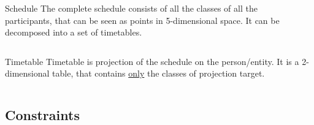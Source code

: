 \documentclass{beamer}
\providecommand{\rootdir}{../doc}
\newcommand{\resizeinput}[2][1]{%
  \resizebox{#1\textwidth}{!}{}%
}
\begin{document}
\begin{frame}
  \begin{columns}
    \begin{column}{4cm}
      \begin{block}{Schedule}
        The complete schedule consists of all the classes of all the participants,
        that can be seen as points in 5-dimensional space. It can be decomposed
        into a set of \alert{timetables}.
      \end{block}
    \end{column}
    \begin{column}{7cm}
        \resizeinput{\rootdir/img/ScheduleHypercube/GRPT-content.tikz}
    \end{column}
  \end{columns}
\end{frame}

\begin{frame}
  \begin{block}{Timetable}
    Timetable is projection of the schedule on the person/entity.
    It is a 2-dimensional table, that contains \underline{only} the classes
    of projection target.
  \end{block}
  \begin{columns}
    \begin{column}{.5\textwidth}
      \centering
      
    \end{column}
    \begin{column}{.5\textwidth}
      \centering
      
    \end{column}
  \end{columns}
\end{frame}

\subsection{Constraints}
\end{document}
